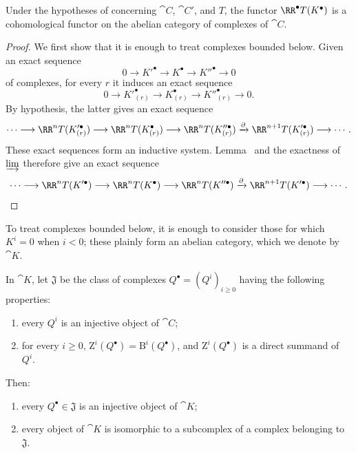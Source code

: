 \begin{proposition}[11.5.2]
\label{0.11.5.2}
Under the hypotheses of  concerning $\cat{C}$, $\cat{C}'$, and $T$, the functor $\RR^\bullet T(K^\bullet)$ is a cohomological functor on the abelian category of complexes of $\cat{C}$.
\end{proposition}

\begin{proof}
We first show that it is enough to treat complexes bounded below.
Given an exact sequence
\[
  0\longrightarrow K'^\bullet\longrightarrow K^\bullet
  \longrightarrow K''^\bullet\longrightarrow 0
\]
of complexes, for every $r$ it induces an exact sequence
\[
  0\longrightarrow K'^\bullet_{(r)}\longrightarrow K^\bullet_{(r)}
  \longrightarrow K''^\bullet_{(r)}\longrightarrow 0.
\]
By hypothesis, the latter gives an exact sequence
\[
  \cdots\longrightarrow\RR^nT(K'^\bullet_{(r)})
  \longrightarrow\RR^nT(K^\bullet_{(r)})
  \longrightarrow\RR^nT(K''^\bullet_{(r)})
  \xrightarrow{\partial}\RR^{n+1}T(K'^\bullet_{(r)})
  \longrightarrow\cdots .
\]
These exact sequences form an inductive system.
Lemma~ and the exactness of $\varinjlim$ therefore give an exact sequence
\[
  \cdots\longrightarrow\RR^nT(K'^\bullet)
  \longrightarrow\RR^nT(K^\bullet)
  \longrightarrow\RR^nT(K''^\bullet)
  \xrightarrow{\partial}\RR^{n+1}T(K'^\bullet)
  \longrightarrow\cdots .
\]
\end{proof}

To treat complexes bounded below, it is enough to consider those for which $K^i=0$ when $i<0$; these plainly form an abelian category, which we denote by $\cat{K}$.

\begin{lemma}[11.5.2.1]
\label{0.11.5.2.1}
In $\cat{K}$, let $\mathfrak{J}$ be the class of complexes $Q^\bullet=(Q^i)_{i\geq0}$ having the
following properties:
\begin{enumerate}
  \item[{\rm(1)}] every $Q^i$ is an injective object of $\cat{C}$;
  \item[{\rm(2)}] for every $i\geq0$, $\mathrm{Z}^i(Q^\bullet)=\mathrm{B}^i(Q^\bullet)$, and $\mathrm{Z}^i(Q^\bullet)$ is a direct summand of $Q^i$.
\end{enumerate}
Then:
\begin{enumerate}
  \item[{\rm(i)}] every $Q^\bullet\in\mathfrak{J}$ is an injective object of $\cat{K}$;
  \item[{\rm(ii)}] every object of $\cat{K}$ is isomorphic to a subcomplex of a complex belonging to $\mathfrak{J}$.
\end{enumerate}
\end{lemma}

